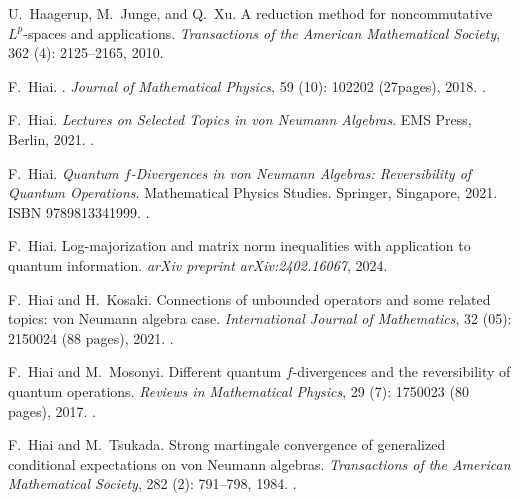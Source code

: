 \documentclass[12pt]{article}
\theoremstyle{definition}
\theoremstyle{remark}
\numberwithin{equation}{section}
\begin{document}
\begin{thebibliography}{27}
U.~Haagerup, M.~Junge, and Q.~Xu.
\newblock A reduction method for noncommutative $L^p$-spaces and applications.
\newblock \emph{Transactions of the American Mathematical Society}, 362
  (4): 2125--2165, 2010.

F.~Hiai.
.
\newblock \emph{Journal of Mathematical Physics}, 59 (10):
 102202 (27pages), 2018.
 \newblock {}.

F.~Hiai.
\newblock \emph{Lectures on Selected Topics in von Neumann Algebras}.
\newblock EMS Press, Berlin, 2021{}.
\newblock {}.

F.~Hiai.
\newblock \emph{Quantum $f$-Divergences in von Neumann Algebras: Reversibility
  of Quantum Operations}.
\newblock Mathematical Physics Studies. Springer, Singapore,
  2021{}.
\newblock ISBN 9789813341999.
\newblock {}.

F.~Hiai.
\newblock Log-majorization and matrix norm inequalities with application to quantum
information.
\newblock \emph{arXiv preprint arXiv:2402.16067}, 2024.

F.~Hiai and H.~Kosaki.
\newblock Connections of unbounded operators and some related topics: von
  {N}eumann algebra case.
\newblock \emph{International Journal of Mathematics}, 32
  (05): 2150024 (88 pages), 2021.
\newblock {}.

F.~Hiai and M.~Mosonyi.
\newblock Different quantum $f$-divergences and the reversibility of quantum
  operations.
\newblock \emph{Reviews in Mathematical Physics}, 29 (7):
  1750023 (80 pages), 2017.
\newblock {}.

F.~Hiai and M.~Tsukada.
\newblock Strong martingale convergence of generalized conditional expectations
  on von {N}eumann algebras.
\newblock \emph{Transactions of the American Mathematical Society},
  282 (2): 791--798, 1984.
\newblock {}.


\end{thebibliography}
\end{document}
